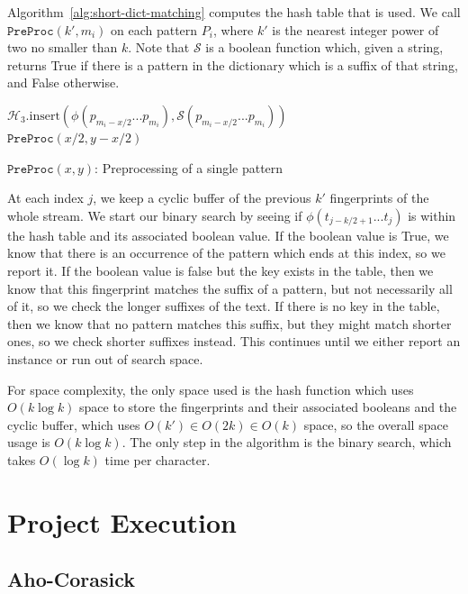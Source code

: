 \documentclass[ %
                    author={Dominic Joseph Moylett},
                    degree={MEng},
                     title={Dictionary Matching with Fingerprints},
                  subtitle={An Empirical Analysis},
                      type={Research},
                      year={2014} ]{dissertation}
\begin{document}
Algorithm~\ref{alg:short-dict-matching} computes the hash table that is used. We call $\mathtt{PreProc}(k',m_i)$ on each pattern $P_i$, where $k'$ is the nearest integer power of two no smaller than $k$. Note that $\mathcal{S}$ is a boolean function which, given a string, returns True if there is a pattern in the dictionary which is a suffix of that string, and False otherwise.

\begin{algorithm}[t]
 {
  $\mathcal{H}_3.\text{insert}(\phi(p_{m_i-x/2}...p_{m_i}), \mathcal{S}(p_{m_i-x/2}...p_{m_i}))$\\
  $\mathtt{PreProc}(x/2,y - x/2)$
}
\caption{$\mathtt{PreProc}(x,y)$: Preprocessing of a single pattern}
\label{alg:short-dict-matching}
\end{algorithm}

At each index $j$, we keep a cyclic buffer of the previous $k'$ fingerprints of the whole stream. We start our binary search by seeing if $\phi(t_{j - k/2 + 1}...t_j)$ is within the hash table and its associated boolean value. If the boolean value is True, we know that there is an occurrence of the pattern which ends at this index, so we report it. If the boolean value is false but the key exists in the table, then we know that this fingerprint matches the suffix of a pattern, but not necessarily all of it, so we check the longer suffixes of the text. If there is no key in the table, then we know that no pattern matches this suffix, but they might match shorter ones, so we check shorter suffixes instead. This continues until we either report an instance or run out of search space.

For space complexity, the only space used is the hash function which uses $O(k\log k)$ space to store the fingerprints and their associated booleans and the cyclic buffer, which uses $O(k') \in O(2k) \in O(k)$ space, so the overall space usage is $O(k\log k)$. The only step in the algorithm is the binary search, which takes $O(\log k)$ time per character.


\chapter{Project Execution}
\label{chap:execution}

\section{Aho-Corasick}
\end{document}
